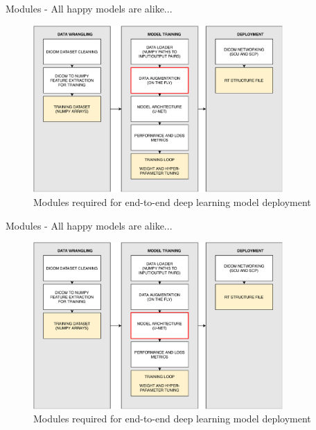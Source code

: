 \documentclass[9pt]{beamer}
\begin{document}
\begin{frame}{Modules - All happy models are alike...}
  \begin{figure}
    \includegraphics[width=0.85\textwidth]{images/modules_augmentation}
    \caption{Modules required for end-to-end deep learning model deployment}
  \end{figure}
\end{frame}

\begin{frame}{Modules - All happy models are alike...}
  \begin{figure}
    \includegraphics[width=0.85\textwidth]{images/modules_model}
    \caption{Modules required for end-to-end deep learning model deployment}
  \end{figure}
\end{frame}
\end{document}

